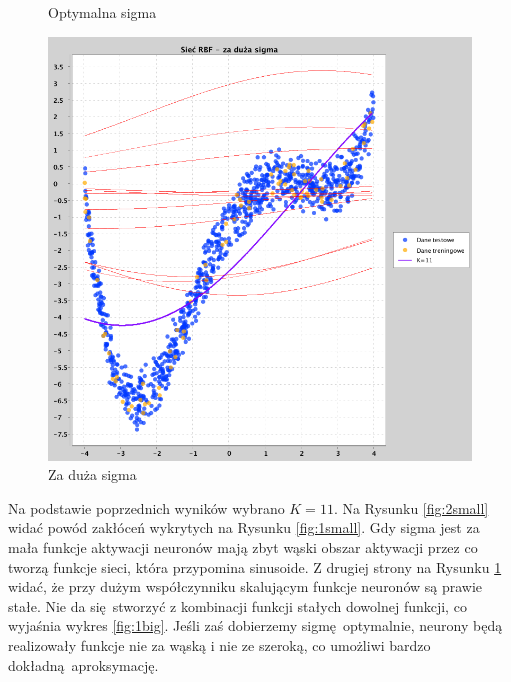 \documentclass[a4paper, portrait,11pt]{article}
\begin{document}
\begin{figure}[!htb]
\begin{minipage}{0.33\textwidth}
    \caption{\label{fig:2optimal}Optymalna sigma}
  \end{minipage}
  \begin{minipage}{0.33\textwidth}
    \centering
    \includegraphics[width=1\linewidth]{../data/approximation3/2/big.png}
    \caption{\label{fig:2big}Za duża sigma}
  \end{minipage}\hfill
\end{figure}
Na podstawie poprzednich wyników wybrano $K=11$. Na Rysunku \ref{fig:2small} widać powód zakłóceń wykrytych na Rysunku \ref{fig:1small}.
Gdy sigma jest za mała funkcje aktywacji neuronów mają zbyt wąski obszar aktywacji przez co tworzą funkcje sieci, która przypomina sinusoide.
Z drugiej strony na Rysunku \ref{fig:2big} widać, że przy dużym współczynniku skalującym funkcje neuronów są prawie stałe.
Nie da się stworzyć z kombinacji funkcji stałych dowolnej funkcji, co wyjaśnia wykres \ref{fig:1big}.
Jeśli zaś dobierzemy sigmę optymalnie, neurony będą realizowały funkcje nie za wąską i nie ze szeroką, co umożliwi bardzo dokładną aproksymację.
\end{document}

